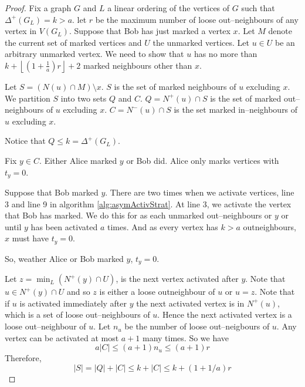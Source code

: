 \begin{proof}
%
Fix a graph $G$ and $L$ a linear ordering of the vertices of $G$ such that $\Delta^+(G_L)=k>a$. let $r$ be the maximum number of loose out--neighbours of any vertex in $V(G_L)$. Suppose that Bob has just marked a vertex $x$. Let $M$ denote the current set of marked vertices and $U$ the unmarked vertices. Let $u\in U$ be an arbitrary unmarked vertex. We need to show that $u$ has no more than  $k+\left\lfloor \left(1+\frac{1}{a}\right)r \right\rfloor +2$ marked neighbours other than $x$. 

Let $S=(N(u)\cap M) \setminus {x}$. $S$ is the set of marked neighbours of $u$ excluding $x$. We partition $S$ into two sets $Q$ and $C$. $Q=N^+(u)\cap S$ is the set of marked out--neighbours of $u$ excluding $x$. $C=N^-(u)\cap S$ is  the set marked in--neighbours of $u$ excluding $x$.

Notice that $Q\leq k = \Delta^+(G_L)$. 

Fix $y\in C$. Either Alice marked $y$ or Bob did. Alice only marks vertices with $t_y=0$. 

Suppose that Bob marked $y$.
There are two times when we activate vertices, line 3 and line 9 in algorithm \ref{alg:asymActivStrat}. At line 3, we activate the vertex that Bob has marked. We do this for as each unmarked out--neighbours or $y$ or until $y$ has been activated $a$ times. And as every vertex has $k>a$ outneighbours, $x$ must have $t_y=0$.

So, weather Alice or Bob marked $y$, $t_y=0$.

Let $z = \min_{L}(N^+(y)\cap U)$, is the next vertex activated after $y$. Note that $u\in N^+(y)\cap U$ and so $z$ is either a loose outneighbour of $u$ or $u=z$. Note that if $u$ is activated immediately after $y$ the next activated vertex is in $N^+(u)$, which is a set of loose out--neighbours of $u$. Hence the next activated vertex is a loose out--neighbour of $u$. Let $n_u$ be the number of loose out--neigbours of $u$. Any vertex can be activated at most $a+1$ many times. So we have 
\[a|C|\leq (a+1)n_u\leq (a+1)r\]
Therefore,
\[|S|=|Q|+|C|\leq k +|C| \leq k + (1+1/a)r\] 
\end{proof}
    
    
    




